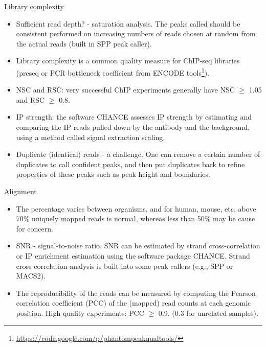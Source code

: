\documentclass{beamer}
\begin{document}
\begin{frame}{Library complexity}
\begin{itemize}
\item Sufficient read depth? - saturation analysis. The peaks called should be consistent performed on increasing numbers of reads chosen at random from the actual reads (built in SPP peak caller).
\item Library complexity is a common quality measure for ChIP-seq libraries (preseq or PCR bottleneck coefficient from ENCODE tools\footnote{\url{https://code.google.com/p/phantompeakqualtools/}}).
\item NSC and RSC: very successful ChIP experiments generally have NSC $\geq$ 1.05 and RSC $\geq$ 0.8.
\item IP strength: the software CHANCE assesses IP strength by estimating and comparing the IP reads pulled down by the antibody and the background, using a method called signal extraction scaling.
\item Duplicate (identical) reads - a challenge. One can remove a certain number of duplicates to call confident peaks, and then put duplicates back to refine properties of these peaks such as peak height and boundaries.
\end{itemize}

\end{frame}
\begin{frame}{Alignment}
\begin{itemize}
\item The percentage varies between organisms, and for human, mouse, etc, above 70\% uniquely mapped reads is normal, whereas less than 50\% may be cause for concern.
\item SNR - signal-to-noise ratio. SNR can be estimated by strand cross-correlation or IP enrichment estimation using the software package CHANCE. Strand cross-correlation analysis is built into some peak callers (e.g., SPP or MACS2).
\item The reproducibility of the reads can be measured by computing the Pearson correlation coefficient (PCC) of the (mapped) read counts at each genomic position. High quality experiments: PCC $\geq$ 0.9. (0.3 for unrelated samples).
\end{itemize}
\end{frame}
\end{document}
